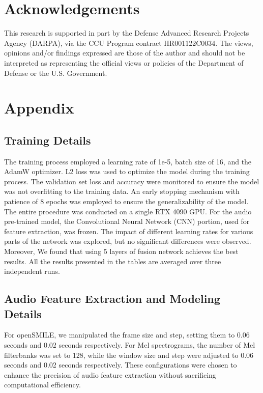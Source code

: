 \documentclass[11pt]{article}
\begin{document}

\section*{Acknowledgements}

This research is supported in part by the Defense Advanced Research Projects Agency (DARPA), via the CCU Program contract HR001122C0034. The views, opinions and/or findings expressed are those of the author and should not be interpreted as representing the official views or policies of the Department of Defense or the U.S. Government.


% 


\clearpage
\appendix

\section{Appendix}
\label{sec:appendix}

\subsection{Training Details}
The training process employed a learning rate of 1e-5, batch size of 16, and the AdamW optimizer. L2 loss was used to optimize the model during the training process. The validation set loss and accuracy were monitored to ensure the model was not overfitting to the training data. An early stopping mechanism with patience of 8 epochs was employed to ensure the generalizability of the model. The entire procedure was conducted on a single RTX 4090 GPU.
For the audio pre-trained model, the Convolutional Neural Network (CNN) portion, used for feature extraction, was frozen. The impact of different learning rates for various parts of the network was explored, but no significant differences were observed. Moreover, We found that using 5 layers of fusion network achieves the best results.
All the results presented in the tables are averaged over three independent runs.
\subsection{Audio Feature Extraction and Modeling Details}
For openSMILE, we manipulated the frame size and step, setting them to 0.06 seconds and 0.02 seconds respectively. For Mel spectrograms, the number of Mel filterbanks was set to 128, while the window size and step were adjusted to 0.06 seconds and 0.02 seconds respectively. These configurations were chosen to enhance the precision of audio feature extraction without sacrificing computational efficiency.
\end{document}
